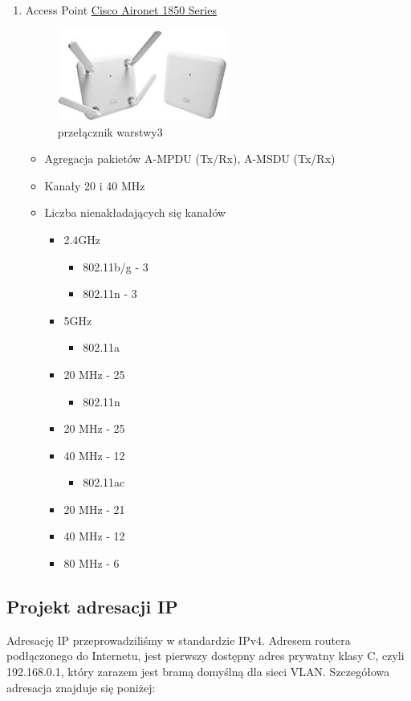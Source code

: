 \documentclass{article}
\begin{document}
\begin{enumerate}
	\item Access Point
	\href{ https://www.cisco.com/c/en/us/products/collateral/wireless/aironet-1850-series-access-points/datasheet-c78-734256.html}{Cisco Aironet 1850 Series}
		\begin{figure}[!ht]	
		\centering
		\includegraphics[height=3cm]{5.jpg}
		\caption{przełącznik warstwy3}
		\label{fig:obrazek 6}
	\end{figure}
	\begin{itemize}
		\item Agregacja pakietów A-MPDU (Tx/Rx), A-MSDU (Tx/Rx)
		\item Kanały 20 i 40 MHz
		\item Liczba nienakładających się kanałów
		\begin{itemize}
			\item 2.4GHz
			\begin{itemize}
			\item 802.11b/g - 3
			\item 802.11n - 3
			\end{itemize}
			\item 5GHz
			\begin{itemize}
				\item 802.11a 
			\end{itemize}
		\item 20 MHz - 25
		\begin{itemize}
			\item 802.11n
		\end{itemize}
		\item 20 MHz - 25
		\item 40 MHz - 12
		\begin{itemize}
			\item 802.11ac
		\end{itemize}
		\item 20 MHz - 21
		\item 40 MHz - 12
		\item 80 MHz - 6
		\end{itemize}
	\end{itemize}
\end{enumerate}
\subsection{Projekt adresacji IP}
Adresację IP przeprowadziliśmy w standardzie IPv4. Adresem routera podłączonego do Internetu, jest pierwszy dostępny adres prywatny klasy C, czyli 192.168.0.1, który zarazem jest bramą domyślną dla sieci VLAN.
Szczegółowa adresacja znajduje się poniżej:
\end{document}
